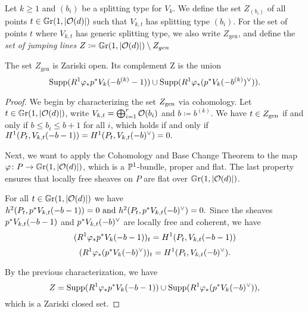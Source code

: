
\begin{definition}
Let $k \geq 1$ and $(b_i)$ be a splitting type for $V_k$. We define the set
$Z_{(b_i)}$ of all points $t\in\mathbb G \mathrm r(1,\lvert\mathcal{O}(d)\rvert)$ such that $V_{k,t}$ has splitting type $(b_i)$. For the set of points $t$ where $V_{k,t}$ has generic splitting type, we also write $Z_{\text{gen}}$, and define the \emph{set of jumping lines} $Z\coloneqq \mathbb G \mathrm r(1,\lvert\mathcal{O}(d)\rvert) \setminus Z_{gen}$
\end{definition}

\begin{proposition}
	The set $Z_{\text{gen}}$ is Zariski open. Its complement Z is the union
	\[
		\operatorname{Supp}(R^1 \varphi_{*}p^{*} V_{k}(-b^{(k)}-1)) \cup
		\operatorname{Supp}(R^1 \varphi_{*}(p^{*} V_{k}(-b^{(k)})^\vee)).
	\]
\end{proposition}
\begin{proof}
	We begin by characterizing the set $Z_{\text{gen}}$ via cohomology. Let $t\in \mathbb G \mathrm r(1,\lvert\mathcal{O}(d)\rvert)$, write $V_{k,t}=\bigoplus_{i=1}^r \mathcal{O}(b_i)$ and $b\coloneqq b^{(k)}$. We have $t\in Z_{\text{gen}}$ if and only if $b\leq b_i \leq b+1$ for all $i$, which holds if and only if
	$
	H^1(P_t, V_{k,t}(-b-1))
	=
	H^1(P_t, V_{k,t}(-b)^\vee)
	=0.
	$

	Next, we want to apply the Cohomology and Base Change Theorem \cite[{}28.1.6]{vakil-algebraic-geometry} to the map 
	$\varphi \colon P \to \mathbb G \mathrm r(1,\lvert\mathcal{O}(d)\rvert)$, which is a $\mathbb{P}^1$-bundle, proper and flat. The last property ensures that locally free sheaves on $P$ are flat over $\mathbb G \mathrm r(1,\lvert\mathcal{O}(d)\rvert)$.

	For all $t\in \mathbb G \mathrm r(1,\lvert\mathcal{O}(d)\rvert)$ we have
	$
	h^2(P_t, p^{*}V_{k,t}(-b-1)) = 0
	\text{ and }
	h^2(P_t,p^{*}V_{k,t}(-b)^\vee)=0.
	$
	Since the sheaves $p^{*}V_{k,t}(-b-1)$ and $p^{*}V_{k,t}(-b)^\vee$ are locally free and coherent, we have 
	\[(R^1 \varphi_{*}p^{*} V_{k}(-b-1))_t = H^1(P_t,V_{k,t}(-b-1))\]
	\[
	(R^1 \varphi_{*}(p^{*} V_{k}(-b)^\vee))_t = H^1(P_t,V_{k,t}(-b)^\vee).
	\]

	By the previous characterization, we have
	\[
		Z =
		\operatorname{Supp}(R^1 \varphi_{*}p^{*} V_{k}(-b-1)) \cup
		\operatorname{Supp}(R^1 \varphi_{*}(p^{*} V_{k}(-b)^\vee)),
	\]
	which is a Zariski closed set.
\end{proof}

